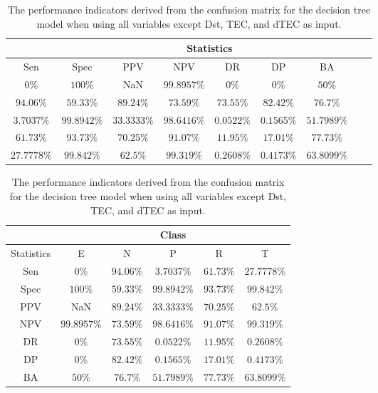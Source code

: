 \begin{table}[!ht]
	\centering
	\begin{tabular}{|c|c|c|c|c|c|c|c|c|}
		\hline
		 & \multicolumn{7}{c|}{Statistics} \\ \hline
		Sen & Spec & PPV & NPV & DR & DP & BA \\ \hline
		$0\%$ & $100\%$ & NaN & $99.8957\%$ & $0\%$ & $0\%$ & $50\%$ \\ \hline
		$94.06\%$ & $59.33\%$ & $89.24\%$ & $73.59\%$ & $73.55\%$ & $82.42\%$ & $76.7\%$ \\ \hline
		$3.7037\%$ & $99.8942\%$ & $33.3333\%$ & $98.6416\%$ & $0.0522\%$ & $0.1565\%$ & $51.7989\%$ \\ \hline
		$61.73\%$ & $93.73\%$ & $70.25\%$ & $91.07\%$ & $11.95\%$ & $17.01\%$ & $77.73\%$ \\ \hline
		$27.7778\%$ & $99.842\%$ & $62.5\%$ & $99.319\%$ & $0.2608\%$ & $0.4173\%$ & $63.8099\%$ \\ \hline
	\end{tabular}
	\caption{The performance indicators derived from the confusion matrix for the decision tree model when using all variables except Dst, TEC, and dTEC as input.}
	\label{tab:cs:noTEC:C5.0}
\end{table}

\begin{table}[!ht]
	\centering
	\begin{tabular}{|c|c|c|c|c|c|}
		\hline
		 & \multicolumn{5}{c|}{Class} \\ \hline
		Statistics & E & N & P & R & T \\ \hline
		Sen & $0\%$ & $94.06\%$ & $3.7037\%$ & $61.73\%$ & $27.7778\%$ \\ \hline
		Spec & $100\%$ & $59.33\%$ & $99.8942\%$ & $93.73\%$ & $99.842\%$ \\ \hline
		PPV & NaN & $89.24\%$ & $33.3333\%$ & $70.25\%$ & $62.5\%$ \\ \hline
		NPV & $99.8957\%$ & $73.59\%$ & $98.6416\%$ & $91.07\%$ & $99.319\%$ \\ \hline
		DR & $0\%$ & $73.55\%$ & $0.0522\%$ & $11.95\%$ & $0.2608\%$ \\ \hline
		DP & $0\%$ & $82.42\%$ & $0.1565\%$ & $17.01\%$ & $0.4173\%$ \\ \hline
		BA & $50\%$ & $76.7\%$ & $51.7989\%$ & $77.73\%$ & $63.8099\%$ \\ \hline
	\end{tabular}
	\caption{The performance indicators derived from the confusion matrix for the decision tree model when using all variables except Dst, TEC, and dTEC as input.}
	\label{tab:cs:reverse:noTEC:C5.0}
\end{table}

